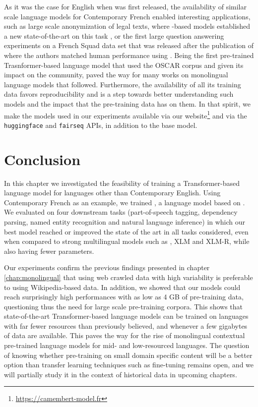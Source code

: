 As it was the case for English when \bert was first released, the availability of similar scale language models for Contemporary French enabled interesting applications, such as large scale anonymization of legal texts, where \camembert-based models established a new state-of-the-art on this task \citep{benesty-2019-ner}, or the first large question answering experiments on a French Squad data set that was released after the publication of \camembert \citep{dhoffschmidt-etal-2020-fquad} where the authors matched human performance using \camembertlarge. Being the first pre-trained Trasnformer-based language model that used the OSCAR corpus and given its impact on the community, \camembert paved the way for many works on monolingual language models that followed. Furthermore, the availability of all its training data favors reproducibility and is a step towards better understanding such models and the impact that the pre-training data has on them. In that spirit, we make the models used in our experiments available via our website\footnote{\url{https://camembert-model.fr}} and via the \texttt{huggingface} and \texttt{fairseq} APIs, in addition to the base \camembert model.

\section{Conclusion}
In this chapter we investigated the feasibility of training a Transformer-based language model for languages other than Contemporary English. Using Contemporary French as an example, we trained \camembert, a language model based on \roberta. We evaluated \camembert on four downstream tasks (part-of-speech tagging, dependency parsing, named entity recognition
and natural language inference) in which our best model reached or improved the state of the art in all tasks considered, even when compared to strong multilingual models such as \mbert, XLM and XLM-R, while also having fewer parameters.

Our experiments confirm the previous findings presented in chapter \ref{chap:monolingual} that using web crawled data with high variability is preferable to using Wikipedia-based data. In addition, we showed that our models could reach surprisingly high performances with as low as 4 GB of pre-training data, questioning thus the need for large scale pre-training corpora. This shows that state-of-the-art Transformer-based language models can be trained on languages with far fewer resources than previously believed, and whenever a few gigabytes of data are available. This paves the way for the rise of monolingual contextual pre-trained language models for mid- and low-resourced languages. The question of knowing whether pre-training on small domain specific content will be a better option than transfer learning techniques such as fine-tuning remains open, and we will partially study it in the context of historical data in upcoming chapters.
